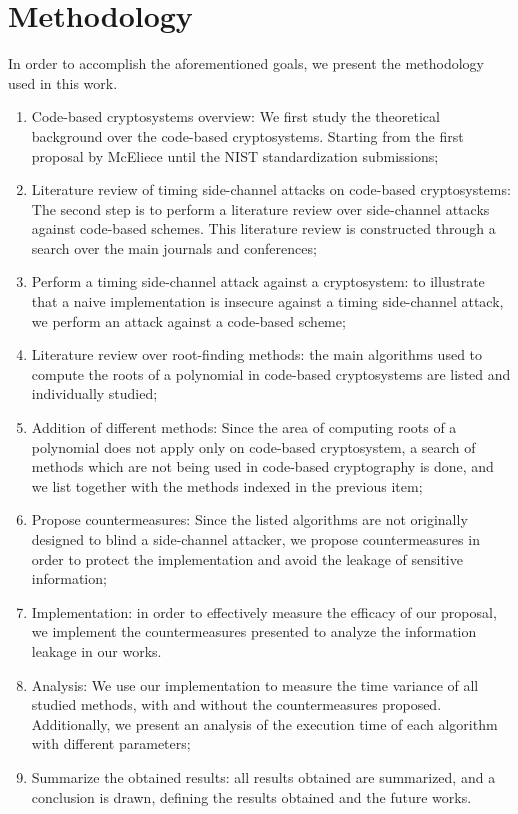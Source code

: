\section{Methodology}
In order to accomplish the aforementioned goals, we present the methodology used in this work.
\begin{enumerate}
    \item Code-based cryptosystems overview: We first study the theoretical background over the code-based cryptosystems. Starting from the first proposal by McEliece until the NIST standardization submissions;
    \item Literature review of timing side-channel attacks on code-based cryptosystems: The second step is to perform a literature review over side-channel attacks against code-based schemes. This literature review is constructed through a search over the main journals and conferences;
    \item Perform a timing side-channel attack against a cryptosystem: to illustrate that a naive implementation is insecure against a timing side-channel attack, we perform an attack against a code-based scheme;
    \item Literature review over root-finding methods: the main algorithms used to compute the roots of a polynomial in code-based cryptosystems are listed and individually studied; 
    \item Addition of different methods: Since the area of computing roots of a polynomial does not apply only on code-based cryptosystem, a search of methods which are not being used in code-based cryptography is done, and we list together with the methods indexed in the previous item;
    \item Propose countermeasures: Since the listed algorithms are not originally designed to blind a side-channel attacker, we propose countermeasures in order to protect the implementation and avoid the leakage of sensitive information;
    \item Implementation: in order to effectively measure the efficacy of our proposal, we implement the countermeasures presented to analyze the information leakage in our works.
    \item Analysis: We use our implementation to measure the time variance of all studied methods, with and without the countermeasures proposed. Additionally, we present an analysis of the execution time of each algorithm with different parameters;
    \item Summarize the obtained results: all results obtained are summarized, and a conclusion is drawn, defining the results obtained and the future works.
\end{enumerate}

